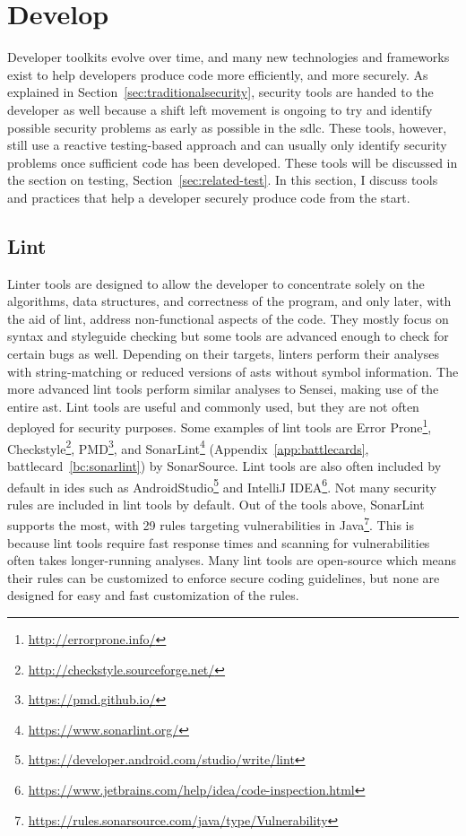 \section{Develop}

Developer toolkits evolve over time, and many new technologies and frameworks exist to help developers produce code more efficiently, and more securely.
As explained in Section~\ref{sec:traditionalsecurity}, security tools are handed to the developer as well because a shift left movement is ongoing to try and identify possible security problems as early as possible in the \gls{sdlc}.
These tools, however, still use a reactive testing-based approach and can usually only identify security problems once sufficient code has been developed.
These tools will be discussed in the section on testing, Section~\ref{sec:related-test}.
In this section, I discuss tools and practices that help a developer securely produce code from the start.

\subsection{Lint}
Linter tools are designed to allow the developer to concentrate solely on the algorithms, data structures, and correctness of the program, and only later, with the aid of lint, address non-functional aspects of the code.
They mostly focus on syntax and styleguide checking but some tools are advanced enough to check for certain bugs as well.
Depending on their targets, linters perform their analyses with string-matching or reduced versions of \glspl{ast} without symbol information.
The more advanced lint tools perform similar analyses to Sensei, making use of the entire \gls{ast}.
Lint tools are useful and commonly used, but they are not often deployed for security purposes.
Some examples of lint tools are Error Prone\footnote{\url{http://errorprone.info/}}, Checkstyle\footnote{\url{http://checkstyle.sourceforge.net/}}, PMD\footnote{\url{https://pmd.github.io/}}, and SonarLint\footnote{\url{https://www.sonarlint.org/}} (Appendix~\ref{app:battlecards}, battlecard~\ref{bc:sonarlint}) by SonarSource.
Lint tools are also often included by default in \glspl{ide} such as AndroidStudio\footnote{\url{https://developer.android.com/studio/write/lint}} and IntelliJ IDEA\footnote{\url{https://www.jetbrains.com/help/idea/code-inspection.html}}.
Not many security rules are included in lint tools by default.
Out of the tools above, SonarLint supports the most, with 29 rules targeting vulnerabilities in Java\footnote{\url{https://rules.sonarsource.com/java/type/Vulnerability}}.
This is because lint tools require fast response times and scanning for vulnerabilities often takes longer-running analyses.
Many lint tools are open-source which means their rules can be customized to enforce secure coding guidelines, but none are designed for easy and fast customization of the rules.

